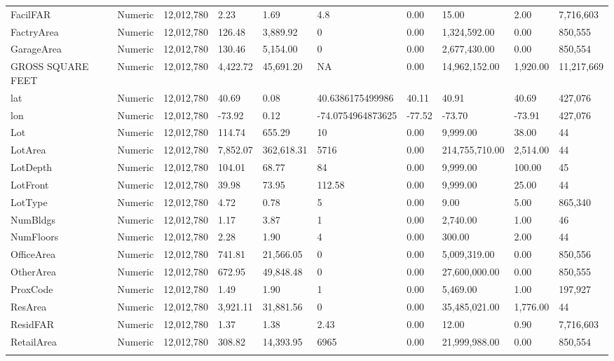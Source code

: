 \documentclass[12pt,]{article}
\begin{document}
\begin{table}
{\begin{tabular}[t]{llllllllll}
FacilFAR & Numeric & 12,012,780 & 2.23 & 1.69 & 4.8 & 0.00 & 15.00 & 2.00 & 7,716,603\\
FactryArea & Numeric & 12,012,780 & 126.48 & 3,889.92 & 0 & 0.00 & 1,324,592.00 & 0.00 & 850,555\\
GarageArea & Numeric & 12,012,780 & 130.46 & 5,154.00 & 0 & 0.00 & 2,677,430.00 & 0.00 & 850,554\\
GROSS SQUARE FEET & Numeric & 12,012,780 & 4,422.72 & 45,691.20 & NA & 0.00 & 14,962,152.00 & 1,920.00 & 11,217,669\\
\addlinespace
lat & Numeric & 12,012,780 & 40.69 & 0.08 & 40.6386175499986 & 40.11 & 40.91 & 40.69 & 427,076\\
lon & Numeric & 12,012,780 & -73.92 & 0.12 & -74.0754964873625 & -77.52 & -73.70 & -73.91 & 427,076\\
Lot & Numeric & 12,012,780 & 114.74 & 655.29 & 10 & 0.00 & 9,999.00 & 38.00 & 44\\
LotArea & Numeric & 12,012,780 & 7,852.07 & 362,618.31 & 5716 & 0.00 & 214,755,710.00 & 2,514.00 & 44\\
LotDepth & Numeric & 12,012,780 & 104.01 & 68.77 & 84 & 0.00 & 9,999.00 & 100.00 & 45\\
\addlinespace
LotFront & Numeric & 12,012,780 & 39.98 & 73.95 & 112.58 & 0.00 & 9,999.00 & 25.00 & 44\\
LotType & Numeric & 12,012,780 & 4.72 & 0.78 & 5 & 0.00 & 9.00 & 5.00 & 865,340\\
NumBldgs & Numeric & 12,012,780 & 1.17 & 3.87 & 1 & 0.00 & 2,740.00 & 1.00 & 46\\
NumFloors & Numeric & 12,012,780 & 2.28 & 1.90 & 4 & 0.00 & 300.00 & 2.00 & 44\\
OfficeArea & Numeric & 12,012,780 & 741.81 & 21,566.05 & 0 & 0.00 & 5,009,319.00 & 0.00 & 850,556\\
\addlinespace
OtherArea & Numeric & 12,012,780 & 672.95 & 49,848.48 & 0 & 0.00 & 27,600,000.00 & 0.00 & 850,555\\
ProxCode & Numeric & 12,012,780 & 1.49 & 1.90 & 1 & 0.00 & 5,469.00 & 1.00 & 197,927\\
ResArea & Numeric & 12,012,780 & 3,921.11 & 31,881.56 & 0 & 0.00 & 35,485,021.00 & 1,776.00 & 44\\
ResidFAR & Numeric & 12,012,780 & 1.37 & 1.38 & 2.43 & 0.00 & 12.00 & 0.90 & 7,716,603\\
RetailArea & Numeric & 12,012,780 & 308.82 & 14,393.95 & 6965 & 0.00 & 21,999,988.00 & 0.00 & 850,554\\
\addlinespace

\end{tabular}}
\end{table}
\end{document}

